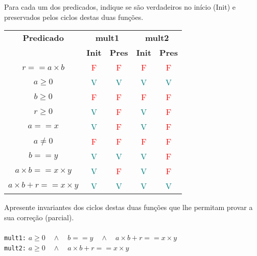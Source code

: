\documentclass{article}
\begin{document}
\noindent Para cada um dos predicados, indique se são verdadeiros no início (Init) e preservados pelos ciclos destas duas funções.

\begin{table}[H]
    \centering
    \renewcommand{\arraystretch}{1.5}
    \begin{tabular}{|c|c|c|c|c|}
        \hline
        \textbf{Predicado} & \multicolumn{2}{c|}{\textbf{mult1}} & \multicolumn{2}{c|}{\textbf{mult2}} \\
        \cline{2-5}
        & \textbf{Init} & \textbf{Pres} & \textbf{Init} & \textbf{Pres} \\
        \hline
        $r == a \times b$ & \textcolor{red}{F} & \textcolor{red}{F} & \textcolor{red}{F} & \textcolor{red}{F} \\
        \hline
        $a \geq 0$ & \textcolor{teal}{V} & \textcolor{teal}{V} & \textcolor{teal}{V} & \textcolor{teal}{V} \\
        \hline
        $b \geq 0$ & \textcolor{red}{F} & \textcolor{red}{F} & \textcolor{red}{F} & \textcolor{red}{F} \\
        \hline
        $r \geq 0$ & \textcolor{teal}{V} & \textcolor{red}{F} & \textcolor{teal}{V} & \textcolor{red}{F} \\
        \hline
        $a == x$ & \textcolor{teal}{V} & \textcolor{red}{F} & \textcolor{teal}{V} & \textcolor{red}{F} \\
        \hline
        $a \neq 0$ & \textcolor{red}{F} & \textcolor{red}{F} & \textcolor{red}{F} & \textcolor{red}{F} \\
        \hline
        $b == y$ & \textcolor{teal}{V} & \textcolor{teal}{V} & \textcolor{teal}{V} & \textcolor{red}{F} \\
        \hline
        $a \times b == x \times y$ & \textcolor{teal}{V} & \textcolor{red}{F} & \textcolor{teal}{V} & \textcolor{red}{F} \\
        \hline
        $a \times b + r == x \times y$ & \textcolor{teal}{V} & \textcolor{teal}{V} & \textcolor{teal}{V} & \textcolor{teal}{V} \\
        \hline
    \end{tabular}
\end{table}

\noindent Apresente invariantes dos ciclos destas duas funções que lhe permitam provar a sua correção (parcial).
\\ \\
\texttt{mult1:} $a \geq 0 \quad \land \quad b == y \quad \land \quad a \times b + r == x \times y $
\\
\texttt{mult2:} $a \geq 0 \quad \land \quad a \times b + r == x \times y $
\\ \\
\end{document}
